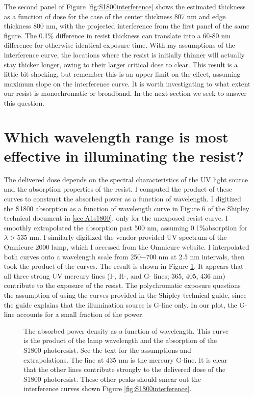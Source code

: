The second panel of Figure \ref{fig:S1800interference} shows the estimated thickness as a function of dose for the case of the center thickness 807 nm and edge thickness 800 nm, with the projected interference from the first panel of the same figure.  The 0.1\% difference in resist thickness can translate into a 60-80 nm difference for otherwise identical exposure time.  With my assumptions of the interference curve, the locations where the resist is initially thinner will actually stay thicker longer, owing to their larger critical dose to clear.  This result is a little bit shocking, but remember this is an upper limit on the effect, assuming maximum slope on the interference curve.  It is worth investigating to what extent our resist is monochromatic or broadband.  In the next section we seek to answer this question.

\section{Which wavelength range is most effective in illuminating the resist?}
The delivered dose depends on the spectral characteristics of the UV light source and the absorption properties of the resist.  I computed the product of these curves to construct the absorbed power as a function of wavelength.  I digitized the S1800 absorption as a function of wavelength curve in Figure 6 of the Shipley technical document in \ref{sec:A1s1800}, only for the unexposed resist curve.  I smoothly extrapolated the absorption past 500 nm, assuming 0.1\%absorption for $\lambda > 535$ nm.  I similarly digitized the vendor-provided UV spectrum of the Omnicure 2000 lamp, which I accessed from the Omnicure website.  I interpolated both curves onto a wavelength scale from 250$-$700 nm at 2.5 nm intervals, then took the product of the curves.  The result is shown in Figure \ref{fig:UVabsSPEC}.  It appears that all three strong UV mercury lines (I-, H-, and G- lines; 365, 405, 436 nm) contribute to the exposure of the resist.  The polychromatic exposure questions the assumption of using the curves provided in the Shipley technical guide, since the guide explains that the illumination source is G-line only.  In our plot, the G-line accounts for a small fraction of the power.  

\begin{figure}[h!] 
\begin{center}
\caption[UV absorption and lamp spectrum]{The absorbed power density as a function of wavelength.  This curve is the product of the lamp wavelength and the absorption of the S1800 photoresist.  See the text for the assumptions and extrapolations.  The line at 435 nm is the mercury G-line.  It is clear that the other lines contribute strongly to the delivered dose of the S1800 photoresist.  These other peaks should smear out the interference curves shown Figure \ref{fig:S1800interference}.}
\label{fig:UVabsSPEC}
\end{center}
\end{figure}



